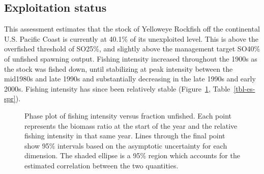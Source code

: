 \documentclass[
]{scrartcl}
\begin{document}
\subsection*{Exploitation status}\label{exploitation-status}

This assessment estimates that the stock of Yelloweye Rockfish off the
continental U.S. Pacific Coast is currently at 40.1\% of its unexploited
level. This is above the overfished threshold of SO25\%, and slightly
above the management target SO40\% of unfished spawning output. Fishing
intensity increased throughout the 1900s as the stock was fished down,
until stabilizing at peak intensity between the mid1980s and late 1990s
and substantially decreasing in the late 1990s and early 2000s. Fishing
intensity has since been relatively stable (Figure~\ref{fig-es-kobe},
Table~\ref{tbl-es-spr}).

\begin{figure}[H]


\caption{\label{fig-es-kobe}Phase plot of fishing intensity versus
fraction unfished. Each point represents the biomass ratio at the start
of the year and the relative fishing intensity in that same year. Lines
through the final point show 95\% intervals based on the asymptotic
uncertainty for each dimension. The shaded ellipse is a 95\% region
which accounts for the estimated correlation between the two
quantities.}

\end{figure}%
\end{document}
